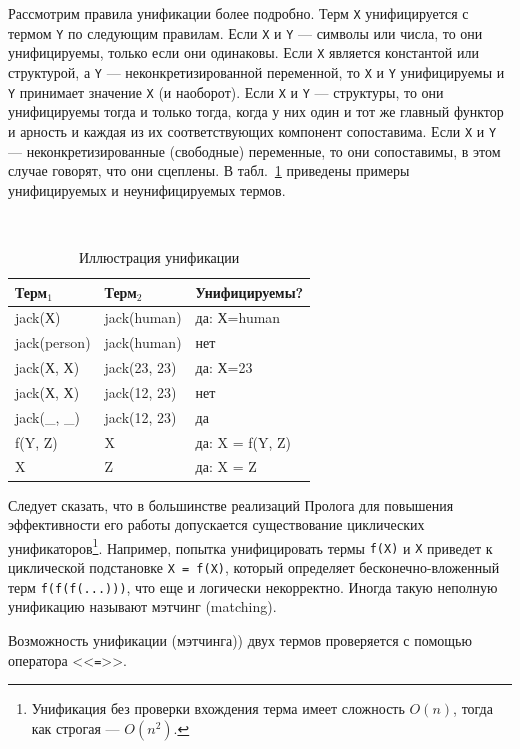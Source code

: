 \documentclass[12pt, openany, twoside]{book} %
\begin{document}
Рассмотрим правила унификации более подробно. Терм {\tt X} унифицируется с термом {\tt Y} по следующим правилам. Если {\tt Х} и {\tt Y} --- символы или числа, то они унифицируемы, только если они одинаковы. Если {\tt Х} является константой или структурой, а {\tt Y} --- неконкретизированной переменной, то {\tt Х} и {\tt Y} унифицируемы и {\tt Y} принимает значение {\tt Х} (и наоборот). Если {\tt Х} и {\tt Y} --- структуры, то они унифицируемы тогда и только тогда, когда у них один и тот же главный функтор и арность и каждая из их соответствующих компонент сопоставима. Если {\tt Х} и {\tt Y} --- неконкретизированные (свободные) переменные, то они сопоставимы, в этом случае говорят, что они сцеплены. В табл.~\ref{tab:unif} приведены примеры унифицируемых и неунифицируемых термов.

\begin{table}[ht]
\caption{Иллюстрация унификации} \label{tab:unif}
\begin{center}\tt
\begin{tabular}{|l|l|l|}
 \hline
 {\rm Терм${}_1$} & {\rm Терм${}_2$}  &  {\rm Унифицируемы?}
 \\\hline\hline
 jack(Х)  &  jack(human) & {\rm да:} Х=human
 \\\hline
 jack(person) & jack(human)  &  {\rm нет}
 \\\hline
 jack(Х, Х) & jack(23, 23)  &  {\rm да:} Х=23
 \\\hline
 jack(Х, Х) & jack(12, 23)  &  {\rm нет}
 \\\hline
 jack(\_, \_) & jack(12, 23)  &  {\rm да}
 \\\hline
 f(Y, Z) & X  &  {\rm да:} X = f(Y, Z)
  \\\hline
 X & Z  &  {\rm да:} X = Z
  \\\hline
\end{tabular}
\end{center}
\end{table}

Следует сказать, что в большинстве реализаций Пролога для повышения эффективности его работы допускается существование циклических унификаторов\footnote{Унификация без проверки вхождения терма имеет сложность $O(n)$, тогда как строгая --- $O(n^2)$.}. Например, попытка унифицировать термы {\tt f(X)} и {\tt Х} приведет к циклической подстановке {\tt X = f(X)}, который определяет бесконечно-вложенный терм {\tt f(f(f(...)))}, что еще и логически некорректно. Иногда такую неполную унификацию называют мэтчинг (matching).

Возможность унификации (мэтчинга)) двух термов проверяется с помощью оператора <<{\tt =}>>.
\end{document}
